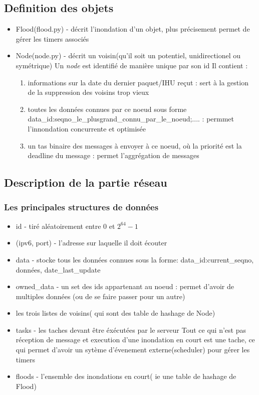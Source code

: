 \documentclass{report}
\begin{document}
\subsection{Definition des objets}
\begin{itemize}
 \item Flood(flood.py) - décrit l'inondation d'un objet, plus précisement permet de gérer les timers associés
 \item Node(node.py) - décrit un voisin(qu'il soit un potentiel, unidirectionel ou symétrique)
  Un \textit{node} est identifié de manière unique par son id
  Il contient :
  \begin{enumerate}
   \item informations sur la date du dernier paquet/IHU reçut : sert à la gestion de la suppression des voisins trop vieux
   \item toutes les données connues par ce noeud sous forme {data\_id:seqno\_le\_plusgrand\_connu\_par\_le\_noeud;....} : permmet l'innondation concurrente et optimisée
   \item un tas binaire des messages à envoyer à ce noeud, où la priorité est la deadline du message : permet l'aggrégation de messages
  \end{enumerate}
\end{itemize}

\subsection{Description de la partie réseau}
\subsubsection{Les principales structures de données}
\begin{itemize}
 \item id - tiré aléatoirement entre 0 et $2^{64}-1$
 \item (ipv6, port) - l'adresse sur laquelle il doit écouter
 \item data - stocke tous les données connues sous la forme:
  {data\_id:current\_seqno, données, date\_last\_update}
 \item owned\_data - un set des ids appartenant au noeud : permet d'avoir de multiples données (ou de se faire passer pour un autre)
 \item les trois listes de voisins( qui sont des table de hashage de Node)
 \item tasks - les taches devant être éxécutées par le serveur
 Tout ce qui n'est pas réception de message et execution d'une inondation en court est une tache, ce qui permet d'avoir un sytème d'évenement externe(scheduler) pour gérer les timers
 \item floods - l'ensemble des inondations en court( ie une table de hashage de Flood)
\end{itemize}
\end{document}

